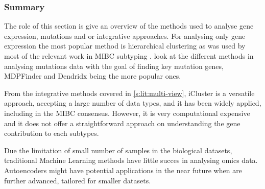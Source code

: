 \subsubsection{Summary}

The role of this section is give an overview of the methods used to analyse gene expression, mutations and or integrative approaches. For analysing only gene expression the most popular method is hierarchical clustering as was used by most of the relevant work in MIBC subtyping \cite{Robertson2017-mg, Sjodahl2017-xr, Kamoun2020-tj}.  look at the different methods in analysing mutations data with the goal of finding key mutation genes, MDPFinder \cite{Zhao2012-wj} and Dendridx \cite{Vandin2012-cf} being the more popular ones. 

From the integrative methods covered in \cref{s:lit:multi-view}, iCluster \cite{Shen2012-yj} is a versatile approach, accepting a large number of data types, and it has been widely applied, including in the MIBC consensus. However, it is very computational expensive and it does not offer a straightforward approach on understanding the gene contribution to each subtypes.

Due the limitation of small number of samples in the biological datasets, traditional Machine Learning methods have little succes in analysing omics data. Autoencoders might have potential applications in the near future when are further advanced, tailored for smaller datasets. 
